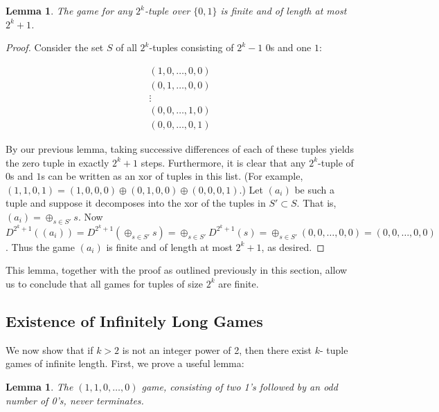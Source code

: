\documentclass[12pt]{amsart}
\newtheorem{lemma}[theorem]{Lemma}
\newcommand{\xor}{\oplus}
\begin{document}
\begin{lemma}
The game for any $2^k$-tuple over $\{0,1\}$ is finite and of length at most $2^k+1$.
\end{lemma}

\begin{proof}
Consider the set $S$ of all $2^k$-tuples consisting of $2^k-1$ $0$s and one $1$:

$$\begin{array}{c}
(1,0,\ldots,0,0) \\
(0,1,\ldots,0,0) \\
\vdots \\
(0,0,\ldots,1,0) \\
(0,0,\ldots,0,1)
\end{array}$$

By our previous lemma, taking successive differences of each of these tuples yields the zero tuple in exactly $2^k+1$ steps. Furthermore, it is clear that any $2^k$-tuple of $0$s and $1$s can be written as an xor of tuples in this list. (For example, $(1,1,0,1)=(1,0,0,0)\xor(0,1,0,0)\xor(0,0,0,1)$.) Let $(a_i)$ be such a tuple and suppose it decomposes into the xor of the tuples in $S'\subset S$. That is, $(a_i)=\xor_{s\in S'} s$. Now $D^{2^k+1}((a_i))=D^{2^k+1}(\xor_{s\in S'} s)=\xor_{s\in S'} D^{2^k+1}(s)=\xor_{s\in S'} (0,0,\ldots,0,0) = (0,0,\ldots,0,0)$. Thus the game $(a_i)$ is finite and of length at most $2^k+1$, as desired.
\end{proof}

This lemma, together with the proof as outlined previously in this section, allow us to conclude that all games for tuples of size $2^k$ are finite.

\subsection{Existence of Infinitely Long Games}

We now show that if $k > 2$ is not an integer power of 2, then there exist $k$- tuple games of infinite length. First, we prove a useful lemma:

\begin{lemma}
The $(1, 1, 0, \ldots, 0)$ game, consisting of two 1's followed by an odd number of 0's, never terminates.
\label{lem:evenodds}
\end{lemma}
\end{document}
